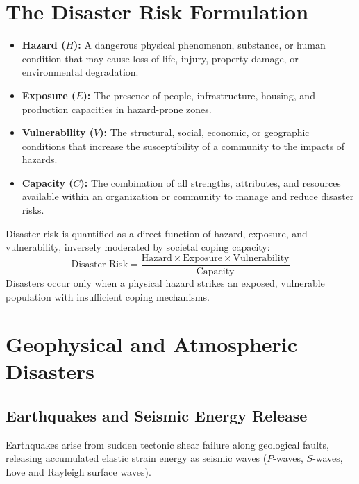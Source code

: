 \section{The Disaster Risk Formulation}
\begin{definition}
\begin{itemize}[leftmargin=1.2em]
    \item \textbf{Hazard ($H$):} A dangerous physical phenomenon, substance, or human condition that may cause loss of life, injury, property damage, or environmental degradation.
    \item \textbf{Exposure ($E$):} The presence of people, infrastructure, housing, and production capacities in hazard-prone zones.
    \item \textbf{Vulnerability ($V$):} The structural, social, economic, or geographic conditions that increase the susceptibility of a community to the impacts of hazards.
    \item \textbf{Capacity ($C$):} The combination of all strengths, attributes, and resources available within an organization or community to manage and reduce disaster risks.
\end{itemize}
\end{definition}

\begin{keyequation}
Disaster risk is quantified as a direct function of hazard, exposure, and vulnerability, inversely moderated by societal coping capacity:
\begin{equation}
\text{Disaster Risk} = \frac{\text{Hazard} \times \text{Exposure} \times \text{Vulnerability}}{\text{Capacity}}
\end{equation}
Disasters occur only when a physical hazard strikes an exposed, vulnerable population with insufficient coping mechanisms.
\end{keyequation}

\section{Geophysical and Atmospheric Disasters}
\subsection{Earthquakes and Seismic Energy Release}
Earthquakes arise from sudden tectonic shear failure along geological faults, releasing accumulated elastic strain energy as seismic waves ($P$-waves, $S$-waves, Love and Rayleigh surface waves).

